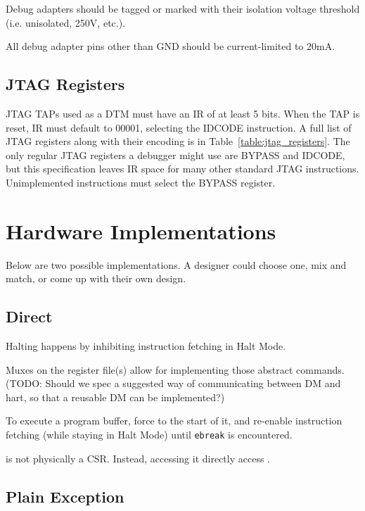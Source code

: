 \documentclass{article}
\begin{document}
Debug adapters should be tagged or marked with their isolation voltage
threshold (i.e. unisolated, 250V, etc.).

All debug adapter pins other than GND should be current-limited to 20mA.

\subsection{JTAG Registers}

JTAG TAPs used as a DTM must have an IR of at least 5 bits.
When the TAP is reset, IR must default to
00001, selecting the IDCODE instruction. A full list of JTAG registers along
with their encoding is in Table~\ref{table:jtag_registers}. The only regular
JTAG registers a debugger might use are BYPASS and IDCODE, but this
specification leaves IR space for many other standard JTAG instructions.
Unimplemented instructions must select the BYPASS register.



\newpage
\appendix

\section{Hardware Implementations}

Below are two possible implementations. A designer could choose one, mix and
match, or come up with their own design.

\subsection{Direct}

Halting happens by inhibiting instruction fetching in Halt Mode.

Muxes on the register file(s) allow for implementing those abstract commands.
(TODO: Should we spec a suggested way of communicating between DM and hart, so
that a reusable DM can be implemented?)

To execute a program buffer, force \Rpc to the start of it, and re-enable
instruction fetching (while staying in Halt Mode) until {\tt ebreak} is
encountered.

\Rdpc is not physically a CSR. Instead, accessing it directly access \Rpc.

\subsection{Plain Exception}
\end{document}
